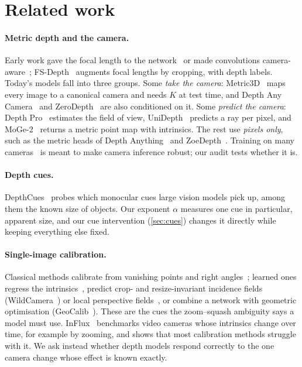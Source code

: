 \section{Related work}
\label{sec:related}

\paragraph{Metric depth and the camera.}
Early work gave the focal length to the network~\cite{he2018focal} or made convolutions
camera-aware~\cite{facil2019camconvs}; FS-Depth~\cite{wei2023fsdepth} augments focal lengths by cropping, with
depth labels. Today's models fall into three groups. Some \emph{take the camera}: Metric3D~\cite{yin2023metric3d,hu2024metric3dv2}
maps every image to a canonical camera and needs $K$ at test time, and Depth Any Camera~\cite{guo2025dac}
and ZeroDepth~\cite{guizilini2023zerodepth} are also conditioned on it. Some \emph{predict the camera}:
Depth Pro~\cite{bochkovskii2025depthpro} estimates the field of view,
UniDepth~\cite{piccinelli2024unidepth,piccinelli2025unidepthv2} predicts a ray per pixel, and
MoGe-2~\cite{wang2025moge2} returns a metric point map with intrinsics. The rest use \emph{pixels only},
such as the metric heads of Depth Anything~\cite{yang2024da,yang2024dav2} and ZoeDepth~\cite{bhat2023zoedepth}.
Training on many cameras~\cite{ma2026metricanything} is meant to make camera inference robust; our audit
tests whether it is.

\paragraph{Depth cues.}
DepthCues~\cite{danier2025depthcues} probes which monocular cues large vision models pick up, among them
the known size of objects. Our exponent $\alpha$ measures one cue in particular, apparent size, and our
cue intervention (\cref{sec:cues}) changes it directly while keeping everything else fixed.

\paragraph{Single-image calibration.}
Classical methods calibrate from vanishing points and right angles~\cite{hartley2004mvg}; learned ones regress
the intrinsics~\cite{bogdan2018deepcalib}, predict crop- and resize-invariant incidence fields
(WildCamera~\cite{zhu2023wildcamera}) or local perspective fields~\cite{jin2023perspectivefields}, or combine a
network with geometric optimisation (GeoCalib~\cite{veicht2024geocalib}). These are the cues the zoom--squash
ambiguity says a model must use. InFlux~\cite{liang2025influx} benchmarks video
cameras whose intrinsics change over time, for example by zooming, and shows that most calibration methods
struggle with it. We ask instead whether depth models respond correctly to the one camera change whose effect
is known exactly.

